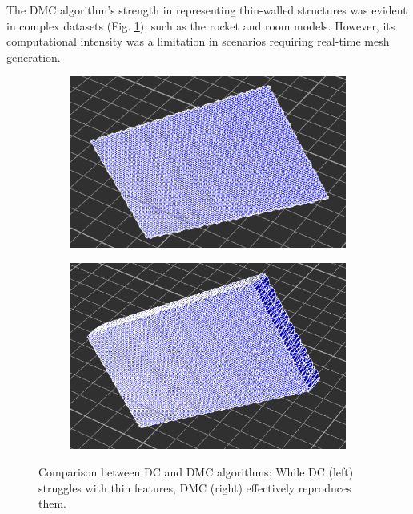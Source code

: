 \noindent The DMC algorithm's strength in representing thin-walled structures was evident in complex datasets (Fig. \ref{fig:DC-DMC-thin-feature}), such as the rocket and room models. However, its computational intensity was a limitation in scenarios requiring real-time mesh generation.

\begin{figure}[H]
    \centering
    \begin{subfigure}{0.5\textwidth}
        \centering
        \includegraphics[height=0.7\textwidth, width=0.9\linewidth]{Figures/DC-thin-brick-new.png}
    \end{subfigure}%
    \begin{subfigure}{0.5\textwidth}
        \centering
        \includegraphics[height=0.7\textwidth, width=0.9\linewidth]{Figures/DMC-thin-brick.png}
    \end{subfigure}
    \decoRule
    \caption{Comparison between DC and DMC algorithms: While DC (left) struggles with thin features, DMC (right) effectively reproduces them.}
    \label{fig:DC-DMC-thin-feature}
\end{figure}

